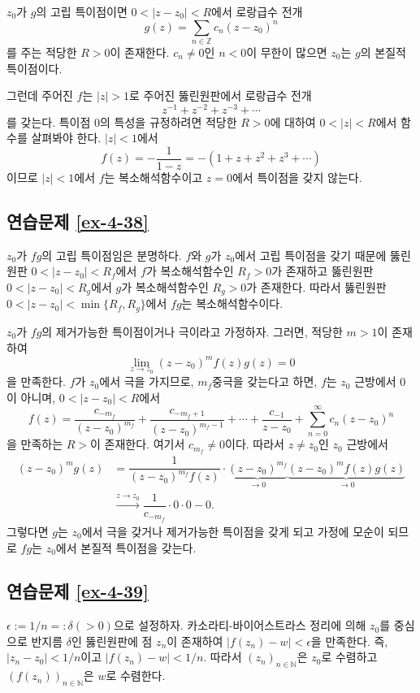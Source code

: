 $z_0$가 $g$의 고립 특이점이면 
$0<|z-z_0|<R$에서 로랑급수 전개
\[
g(z) = \sum_{n\in\mathbb Z} c_n(z-z_0)^n
\]
를 주는 적당한 $R>0$이 존재한다.
$c_n\ne0$인  $n<0$이 무한이 많으면 $z_0$는 $g$의 본질적 특이점이다.

그런데 주어진 $f$는 $|z|>1$로 주어진 뚫린원판에서 로랑급수 전개
\[
z^{-1} + z^{-2} + z^{-3} + \cdots
\]
를 갖는다. 특이점 $0$의 특성을 규정하려면 
적당한 $R>0$에 대하여 $0<|z|<R$에서 함수를 살펴봐야 한다.
$|z|<1$에서 
\[
f(z) = - \dfrac1{1-z} = - (1+z+z^2+ z^3 + \cdots )
\]
이므로 $ |z|<1$에서 $f$는 복소해석함수이고
$z=0$에서 특이점을 갖지 않는다.

\subsection*{연습문제 \ref{ex-4-38}}

$z_0$가 $fg$의 고립 특이점임은 분명하다.
$f$와 $g$가 $z_0$에서 고립 특이점을 갖기 때문에
뚫린원판 $0<|z-z_0|<R_f$에서 $f$가 복소해석함수인  $R_f>0$가 존재하고
뚫린원판 $0<|z-z_0|<R_g$에서 $g$가 복소해석함수인  $R_g>0$가 존재한다.
따라서 뚫린원판  $0<|z-z_0| < \min\{R_f, R_g\}$에서
$fg$는 복소해석함수이다.

$z_0$가 $fg$의 제거가능한 특이점이거나 극이라고 가정하자.
그러면, 적당한 $m>1$이 존재하여
\[
\lim_{z\to z_0} (z-z_0)^m f(z)g(z) = 0
\]
을 만족한다.
$f$가 $z_0$에서 극을 가지므로, $m_f$중극을 갖는다고 하면,
$f$는 $z_0$ 근방에서 $0$이 아니며, $0<|z-z_0|<R$에서
\[
f(z) = \dfrac{c_{-m_f}}{(z-z_0)^{m_f}} + \dfrac{c_{-m_f+1}}{(z-z_0)^{m_f-1}} +
\cdots + \dfrac{c_{-1}}{z-z_0} + \sum_{n=0}^\infty c_n(z-z_0)^n
\]
을 만족하는 $R>$이 존재한다.
여기서 $c _{m_f} \ne0$이다.
따라서 $z\ne z_0$인 $z_0$ 근방에서
\begin{align*}
(z-z_0)^mg(z)
&= \dfrac1{(z-z_0)^{m_f}f(z)} \cdot \underbrace{(z-z_0)^{m_f}}_{\to0}
\underbrace{(z-z_0)^mf(z)g(z)}_{\to 0} \\
&\stackrel{z\to z_0}{\longrightarrow} \dfrac1{c_{-m_f}}\cdot 0 \cdot 0 - 0.
\end{align*}
그렇다면 $g$는 $z_0$에서 극을 갖거나 제거가능한 특이점을 갖게 되고
가정에 모순이 되므로 $fg$는 $z_0$에서 본질적 특이점을 갖는다.

\subsection*{연습문제 \ref{ex-4-39}}

$\epsilon:= 1/n =:\delta(>0)$으로 설정하자.
카소라티-바이어스트라스 정리에 의해
$z_0$를 중심으로 반지름 $\delta$인 뚫린원판에 점 $z_n$이 존재하여
$|f(z_n)-w|<\epsilon$을 만족한다.
즉, $|z_n - z_0| <1/n$이고 $|f(z_n) - w|< 1/n$.
따라서 $(z_n)_{n\in\mathbb N}$은 $z_0$로 수렴하고
$(f(z_n))_{n\in\mathbb N}$은 $w$로 수렴한다.

